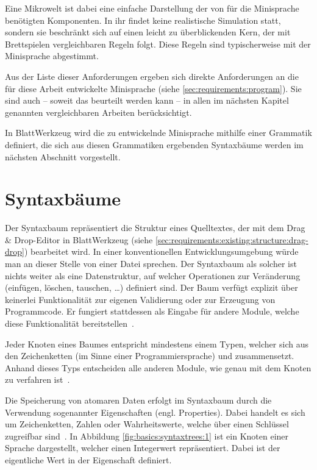 Eine Mikrowelt ist dabei eine einfache Darstellung der von für die Minisprache benötigten Komponenten. In ihr findet keine realistische Simulation statt, sondern sie beschränkt sich auf einen leicht zu überblickenden Kern, der mit Brettspielen vergleichbaren Regeln folgt. Diese Regeln sind typischerweise mit der Minisprache abgestimmt.

Aus der Liste dieser Anforderungen ergeben sich direkte Anforderungen an die für diese Arbeit entwickelte Minisprache (siehe \ref{sec:requirements:program}). Sie sind auch -- soweit das beurteilt werden kann -- in allen im nächsten Kapitel genannten vergleichbaren Arbeiten berücksichtigt.

In BlattWerkzeug wird die zu entwickelnde Minisprache mithilfe einer Grammatik definiert, die sich aus diesen Grammatiken ergebenden Syntaxbäume werden im nächsten Abschnitt vorgestellt.

\section{Syntaxbäume}
\label{sec:basics:syntaxtrees}

Der Syntaxbaum repräsentiert die Struktur eines Quelltextes, der mit dem Drag \& Drop-Editor in BlattWerkzeug (siehe \ref{sec:requirements:existing:structure:drag-drop}) bearbeitet wird. In einer konventionellen Entwicklungsumgebung würde man an dieser Stelle von einer Datei sprechen. Der Syntaxbaum als solcher ist nichts weiter als eine Datenstruktur, auf welcher Operationen zur Veränderung (einfügen, löschen, tauschen, \dots) definiert sind. Der Baum verfügt explizit über keinerlei Funktionalität zur eigenen Validierung oder zur Erzeugung von Programmcode. Er fungiert stattdessen als Eingabe für andere Module, welche diese Funktionalität bereitstellen~\cite[3]{riemer2018}.

Jeder Knoten eines Baumes entspricht mindestens einem Typen, welcher sich aus den Zeichenketten  (im Sinne einer Programmiersprache) und  zusammensetzt. Anhand dieses Typs entscheiden alle anderen Module, wie genau mit dem Knoten zu verfahren ist~\cite[4]{riemer2018}.

Die Speicherung von atomaren Daten erfolgt im Syntaxbaum durch die Verwendung sogenannter Eigenschaften (engl. Properties). Dabei handelt es sich um Zeichenketten, Zahlen oder Wahrheitswerte, welche über einen Schlüssel zugreifbar sind~\cite[4]{riemer2018}. In Abbildung \ref{fig:basics:syntaxtrees:1} ist ein Knoten  einer Sprache  dargestellt, welcher einen Integerwert repräsentiert. Dabei ist der eigentliche Wert in der Eigenschaft  definiert.

